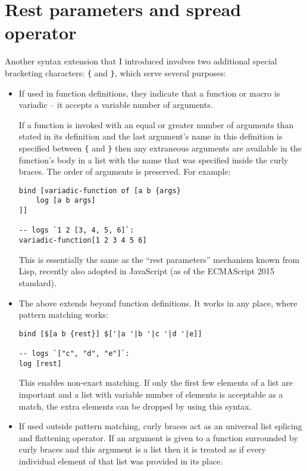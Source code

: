 \section{Rest parameters and spread operator}\label{sub:rest}
Another syntax extension that I introduced involves two additional special
bracketing characters: \texttt{\{} and \texttt{\}}, which serve several
purposes:
\begin{itemize}
    \item If used in function definitions, they indicate that a function or macro is variadic -- it accepts a variable number of arguments\cite{vararg_wikipedia}.
    
    If a function is invoked with an equal or greater number of arguments than stated in its definition and the last argument's name in this definition is specified between \texttt{\{} and \texttt{\}} then any extraneous arguments are available in the function's body in a list with the name that was specified inside the curly braces. The order of arguments is preserved. For example:
\begin{lstlisting}
bind [variadic-function of [a b {args}
    log [a b args]
]]

-- logs `1 2 [3, 4, 5, 6]`:
variadic-function[1 2 3 4 5 6]
\end{lstlisting}
    
    This is essentially the same as the ``rest parameters'' mechanism known from Lisp\cite[Section~12.2.3]{emacs_lisp_reference}, recently also adopted in JavaScript (as of the ECMAScript 2015 standard\cite{mdn_rest}).
    
    \item The above extends beyond function definitions. It works in any place, where pattern matching works:
\begin{lstlisting}
bind [$[a b {rest}] $['|a '|b '|c '|d '|e]]

-- logs `["c", "d", "e"]`:
log [rest]
\end{lstlisting}
    
    This enables non-exact matching. If only the first few elements of a list are important and a list with variable number of elements is acceptable as a match, the extra elements can be dropped by using this syntax.
    
    \item If used outside pattern matching, curly braces act as an universal list splicing and flattening operator. If an argument is given to a function surrounded by curly braces and this argument is a list then it is treated as if every individual element of that list was provided in its place.
    

\end{itemize}
